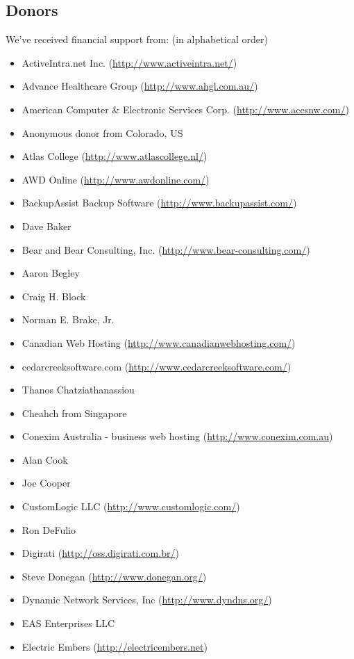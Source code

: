 \documentclass[a4paper,titlepage,12pt]{article}
\begin{document}
    \subsection{Donors}
    We've received financial support from: (in alphabetical order)
    \begin{itemize}
	\item ActiveIntra.net Inc. (\url{http://www.activeintra.net/})
	\item Advance Healthcare Group (\url{http://www.ahgl.com.au/})
	\item American Computer \& Electronic Services Corp. (\url{http://www.acesnw.com/})
	\item Anonymous donor from Colorado, US
	\item Atlas College (\url{http://www.atlascollege.nl/})
	\item AWD Online (\url{http://www.awdonline.com/})
	\item BackupAssist Backup Software (\url{http://www.backupassist.com/})
	\item Dave Baker
	\item Bear and Bear Consulting, Inc. (\url{http://www.bear-consulting.com/})
	\item Aaron Begley
	\item Craig H. Block
	\item Norman E. Brake, Jr.
	\item Canadian Web Hosting (\url{http://www.canadianwebhosting.com/})
	\item cedarcreeksoftware.com (\url{http://www.cedarcreeksoftware.com/})
	\item Thanos Chatziathanassiou
	\item Cheahch from Singapore
	\item Conexim Australia - business web hosting (\url{http://www.conexim.com.au})
	\item Alan Cook
	\item Joe Cooper
	\item CustomLogic LLC (\url{http://www.customlogic.com/})
	\item Ron DeFulio
	\item Digirati (\url{http://oss.digirati.com.br/})
	\item Steve Donegan (\url{http://www.donegan.org/})
	\item Dynamic Network Services, Inc (\url{http://www.dyndns.org/})
	\item EAS Enterprises LLC
	\item Electric Embers (\url{http://electricembers.net})

\end{itemize}
\end{document}
